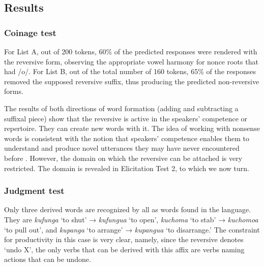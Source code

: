 \documentclass[output=paper]{langsci/langscibook}
\begin{document}
\subsection{Results}\label{sec:ngonyaningowa:4.2}
\subsubsection{Coinage test}\label{sec:ngonyaningowa:4.2.1}

For List A, out of 200 tokens, 60\% of the predicted responses were rendered with the reversive form, observing the appropriate vowel harmony for nonce roots that had /o/. For List B, out of the total number of 160 tokens, 65\% of the responses removed the supposed reversive suffix, thus producing the predicted non-reversive forms.

The results of both directions of word formation (adding and subtracting a suffixal piece) show that the reversive is active in the speakers’ competence or repertoire. They can create new words with it. The idea of working with nonsense words is consistent with the notion that speakers’ competence enables them to understand and produce novel utterances they may have never encountered before \citep{AronoffSchvaneveldt1978}. However, the domain on which the reversive can be attached is very restricted. The domain is revealed in Elicitation Test 2, to which we now turn.

\subsubsection{Judgment test}\label{sec:ngonyaningowa:4.2.2}

Only three derived words are recognized by all as words found in the language. They are \textit{kufunga} ‘to shut’ → \textit{kufungua} ‘to open’, \textit{kuchoma} ‘to stab’ → \textit{kuchomoa} ‘to pull out’, and \textit{kupanga} ‘to arrange’ → \textit{kupangua} ‘to disarrange.’ The constraint for productivity in this case is very clear, namely, since the reversive denotes ‘undo X’, the only verbs that can be derived with this affix are verbs naming actions that can be undone.
\end{document}
